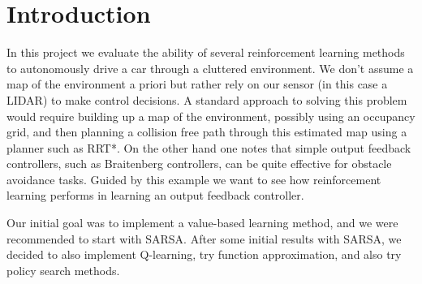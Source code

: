 \documentclass{article}
\begin{document}
 



\section{Introduction}
In this project we evaluate the ability of several reinforcement learning methods to autonomously drive a car through a cluttered environment. We don't assume a map of the environment a priori but rather rely on our sensor (in this case a LIDAR) to make control decisions. A standard approach to solving this problem would require building up a map of the environment, possibly using an occupancy grid, and then planning a collision free path through this estimated map using a planner such as RRT*. On the other hand one notes that simple output feedback controllers, such as Braitenberg controllers, can be quite effective for obstacle avoidance tasks. Guided by this example we want to see how reinforcement learning performs in learning an output feedback controller.

Our initial goal was to implement a value-based learning method, and we were recommended to start with SARSA.  After some initial results with SARSA, we decided to also implement Q-learning, try function approximation, and also try policy search methods. 
\end{document}
